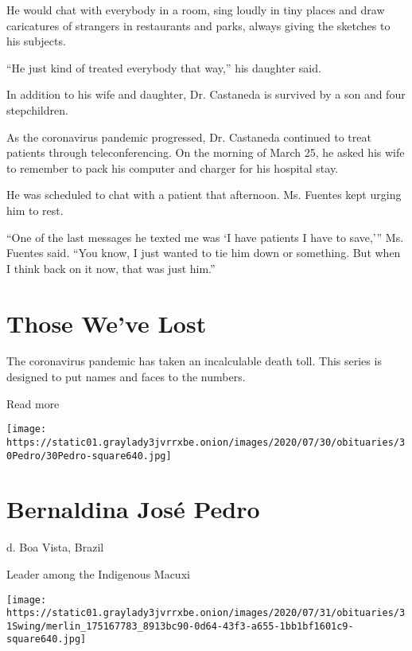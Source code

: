 He would chat with everybody in a room, sing loudly in tiny places and
draw caricatures of strangers in restaurants and parks, always giving
the sketches to his subjects.

``He just kind of treated everybody that way,'' his daughter said.

In addition to his wife and daughter, Dr. Castaneda is survived by a son
and four stepchildren.

As the coronavirus pandemic progressed, Dr. Castaneda continued to treat
patients through teleconferencing. On the morning of March 25, he asked
his wife to remember to pack his computer and charger for his hospital
stay.

He was scheduled to chat with a patient that afternoon. Ms. Fuentes kept
urging him to rest.

``One of the last messages he texted me was `I have patients I have to
save,''' Ms. Fuentes said. ``You know, I just wanted to tie him down or
something. But when I think back on it now, that was just him.''

\href{https://www.nytimes3xbfgragh.onion/interactive/2020/obituaries/people-died-coronavirus-obituaries.html?action=click\&pgtype=Article\&state=default\&region=BELOW_MAIN_CONTENT\&context=covid_obits_promo}{}

\hypertarget{those-weve-lost}{%
\section{Those We've Lost}\label{those-weve-lost}}

The coronavirus pandemic has taken an incalculable death toll. This
series is designed to put names and faces to the numbers.

Read more

\texttt{[image: https://static01.graylady3jvrrxbe.onion/images/2020/07/30/obituaries/30Pedro/30Pedro-square640.jpg]}

\hypertarget{bernaldina-josuxe9-pedro}{%
\section{Bernaldina José Pedro}\label{bernaldina-josuxe9-pedro}}

d. Boa Vista, Brazil

Leader among the Indigenous Macuxi

\texttt{[image: https://static01.graylady3jvrrxbe.onion/images/2020/07/31/obituaries/31Swing/merlin\_175167783\_8913bc90-0d64-43f3-a655-1bb1bf1601c9-square640.jpg]}

